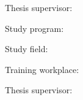 


Thesis supervisor: \mySupervisor

\medskip{}
\myDateENBPOne


\newpage
\thispagestyle{empty}
\mbox{}
\newpage





Study program: \myStudyProgramEN

Study field: \myDegreeCourseEN

Training workplace: \myInstituteEN

Thesis supervisor: \mySupervisor

\medskip{}

\myDateENBPOne


\newpage
\thispagestyle{empty}
\mbox{}
\newpage

